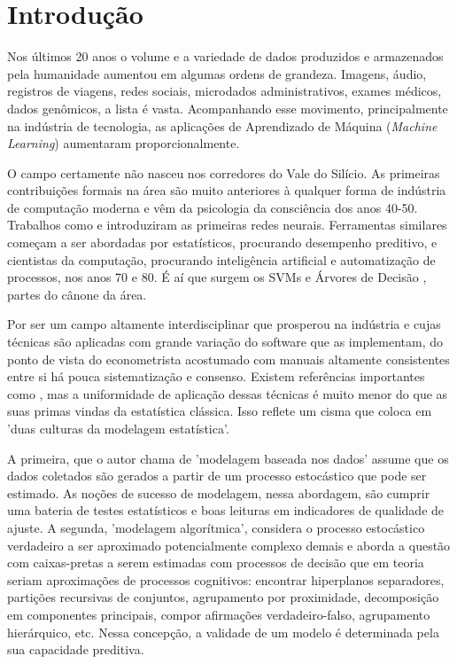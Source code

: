 

\chapter{Introdução}
\label{cap:intro} %



Nos últimos 20 anos o volume e a variedade de dados produzidos e armazenados pela humanidade aumentou em algumas ordens de grandeza.  Imagens, áudio, registros de viagens, redes sociais, microdados administrativos, exames médicos, dados genômicos, a lista é vasta. Acompanhando esse movimento, principalmente na indústria de tecnologia, as aplicações de Aprendizado de Máquina (\textit{Machine Learning}) aumentaram proporcionalmente.

O campo certamente não nasceu nos corredores do Vale do Silício. As primeiras contribuições formais na área são muito anteriores à qualquer forma de indústria de computação moderna e vêm da psicologia da consciência dos anos 40-50. Trabalhos como  e  introduziram as primeiras redes neurais. Ferramentas similares começam a ser abordadas por estatísticos, procurando desempenho preditivo, e cientistas da computação, procurando inteligência artificial e automatização de processos, nos anos 70 e 80. É aí que surgem os SVMs \cite{vapnik1974theory} e Árvores de Decisão \cite{breiman1984classification}, partes do cânone da área.

Por ser um campo altamente interdisciplinar que prosperou na indústria e cujas técnicas são aplicadas com grande variação do software que as implementam, do ponto de vista do econometrista acostumado com manuais altamente consistentes entre si há pouca sistematização e consenso. Existem referências importantes como , mas a uniformidade de aplicação dessas técnicas é muito menor do que as suas primas vindas da estatística clássica. Isso reflete um cisma que  coloca em 'duas culturas da modelagem estatística'. 

A primeira, que o autor chama de 'modelagem baseada nos dados' assume que os dados coletados são gerados a partir de um processo estocástico que pode ser estimado. As noções de sucesso de modelagem, nessa abordagem, são cumprir uma bateria de testes estatísticos e boas leituras em indicadores de qualidade de ajuste. A segunda, 'modelagem algorítmica', considera o processo estocástico verdadeiro a ser aproximado potencialmente complexo demais e aborda a questão com caixas-pretas a serem estimadas com processos de decisão que em teoria seriam aproximações de processos cognitivos: encontrar hiperplanos separadores, partições recursivas de conjuntos, agrupamento por proximidade, decomposição em componentes principais, compor afirmações verdadeiro-falso, agrupamento hierárquico, etc. Nessa concepção, a validade de um modelo é determinada pela sua capacidade preditiva. 

